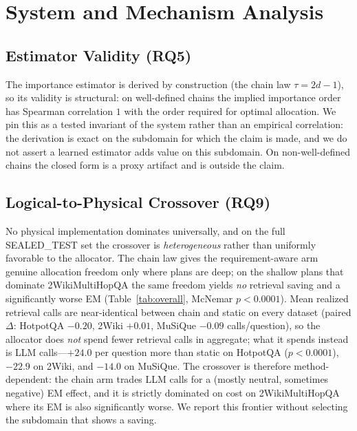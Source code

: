 \section{System and Mechanism Analysis}
\label{sec:mechanism}

\subsection{Estimator Validity (RQ5)}
The importance estimator is derived by construction (the chain law
$\tau = 2d-1$), so its validity is structural: on well-defined chains the
implied importance order has Spearman correlation $1$ with the order required
for optimal allocation. We pin this as a tested invariant of the system rather
than an empirical correlation: the derivation is exact on the subdomain for
which the claim is made, and we do not assert a learned estimator adds value on
this subdomain. On non-well-defined chains the closed form is a proxy artifact
and is outside the claim.

\subsection{Logical-to-Physical Crossover (RQ9)}
No physical implementation dominates universally, and on the full
SEALED\_TEST set the crossover is \emph{heterogeneous} rather than uniformly
favorable to the allocator. The chain law gives the requirement-aware arm
genuine allocation freedom only where plans are deep; on the shallow plans that
dominate 2WikiMultiHopQA the same freedom yields \emph{no} retrieval saving and
a significantly worse EM (Table~\ref{tab:overall}, McNemar
$p<0.0001$). Mean realized retrieval calls are near-identical between chain and
static on every dataset (paired $\Delta$: HotpotQA $-0.20$, 2Wiki $+0.01$,
MuSiQue $-0.09$ calls/question), so the allocator does \emph{not} spend fewer
retrieval calls in aggregate; what it spends instead is LLM calls---$+24.0$
per question more than static on HotpotQA ($p<0.0001$), $-22.9$ on 2Wiki, and
$-14.0$ on MuSiQue. The crossover is therefore method-dependent: the chain arm
trades LLM calls for a (mostly neutral, sometimes negative) EM effect, and it
is strictly dominated on cost on 2WikiMultiHopQA where its EM is also
significantly worse. We report this frontier without selecting the subdomain
that shows a saving.

